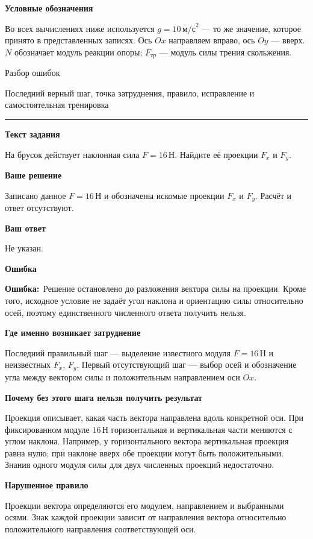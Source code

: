 \documentclass[a4paper,12pt]{article}
\newcommand{\reviewtitle}[1]{\noindent{\Large\bfseries\color{deepaccent}Задание №#1}\par\vspace{2mm}\noindent\rule{\linewidth}{0.35pt}\vspace{2mm}}
\newcommand{\subblock}[1]{\par\medskip\textbf{\color{deepaccent}#1}\par\vspace{-2pt}}
\newcommand{\errorlabel}{\textcolor{errorred}{\textbf{Ошибка:}}}
\begin{document}
\vspace{5mm}
\subblock{Условные обозначения}
Во всех вычислениях ниже используется $g=10\,\text{м/с}^2$ --- то же значение, которое принято в представленных записях. Ось $Ox$ направляем вправо, ось $Oy$ --- вверх. $N$ обозначает модуль реакции опоры; $F_{\text{тр}}$ --- модуль силы трения скольжения.

\clearpage
\thispagestyle{empty}
\vspace*{0.34\textheight}
\begin{center}
{\fontsize{26}{32}\selectfont\color{deepaccent}Разбор ошибок}\par
\vspace{7mm}
{\normalsize Последний верный шаг, точка затруднения, правило, исправление и самостоятельная тренировка}
\end{center}
\clearpage

\label{task:1}
\reviewtitle{1}
\subblock{Текст задания}
На брусок действует наклонная сила $F=16\,\text{Н}$. Найдите её проекции $F_x$ и $F_y$.

\subblock{Ваше решение}
Записано данное $F=16\,\text{Н}$ и обозначены искомые проекции $F_x$ и $F_y$. Расчёт и ответ отсутствуют.

\subblock{Ваш ответ}
Не указан.

\subblock{Ошибка}
\errorlabel\ Решение остановлено до разложения вектора силы на проекции. Кроме того, исходное условие не задаёт угол наклона и ориентацию силы относительно осей, поэтому единственного численного ответа получить нельзя.

\subblock{Где именно возникает затруднение}
Последний правильный шаг --- выделение известного модуля $F=16\,\text{Н}$ и неизвестных $F_x$, $F_y$. Первый отсутствующий шаг --- выбор осей и обозначение угла между вектором силы и положительным направлением оси $Ox$.

\subblock{Почему без этого шага нельзя получить результат}
Проекция описывает, какая часть вектора направлена вдоль конкретной оси. При фиксированном модуле $16\,\text{Н}$ горизонтальная и вертикальная части меняются с углом наклона. Например, у горизонтального вектора вертикальная проекция равна нулю; при наклоне вверх обе проекции могут быть положительными. Знания одного модуля силы для двух численных проекций недостаточно.

\subblock{Нарушенное правило}
Проекции вектора определяются его модулем, направлением и выбранными осями. Знак каждой проекции зависит от направления вектора относительно положительного направления соответствующей оси.
\end{document}
